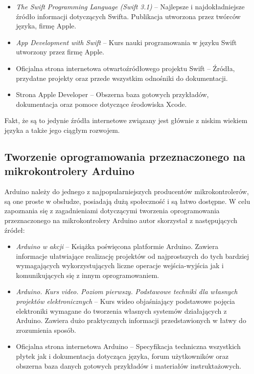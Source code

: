 \documentclass[12pt]{report}
\begin{document}
\begin{itemize}
	\item {\it The Swift Programming Language (Swift 3.1)} \cite{swiftpub} -- Najlepsze i najdokładniejsze źródło informacji dotyczących Swifta. Publikacja utworzona przez twórców języka, firmę Apple. 
	\item {\it App Development with Swift} \cite{swiftdev} -- Kurs nauki programowania w języku Swift utworzony przez firmę Apple.
	\item Oficjalna strona internetowa otwartoźródłowego projektu Swift \cite{swiftstr} -- Źródła, przydatne projekty oraz przede wszystkim odnośniki do dokumentacji.
	\item Strona Apple Developer \cite{swiftapple} -- Obszerna baza gotowych przykładów, dokumentacja oraz pomoce dotyczące środowiska Xcode.
\end{itemize}

Fakt, że są to jedynie źródła internetowe związany jest głównie z niskim wiekiem języka a także jego ciągłym rozwojem.

\subsection{Tworzenie oprogramowania przeznaczonego na mikrokontrolery Arduino}

Arduino należy do jednego z najpopularniejszych producentów mikrokontrolerów, są one proste w obsłudze, posiadają dużą społeczność i są łatwo dostępne. W celu zapoznania się z zagadnieniami dotyczącymi tworzenia oprogramowania przeznaczonego na mikrokontrolery Arduino autor skorzystał z następujących źródeł:

\begin{itemize}
	\item {\it Arduino w akcji} \cite{arduinowakcji} -- Książka poświęcona platformie Arduino. Zawiera informacje ułatwiające realizację projektów od najprostszych do tych bardziej wymagających wykorzystujących liczne operacje wejścia-wyjścia jak i komunikujących się z innym oprogramowaniem.
	\item {\it Arduino. Kurs video. Poziom pierwszy. Podstawowe techniki dla własnych projektów elektronicznych} \cite{arduinovid} -- Kurs wideo objaśniający podstawowe pojęcia elektroniki wymagane do tworzenia własnych systemów działających z Arduino. Zawiera dużo praktycznych informacji przedstawionych w łatwy do zrozumienia sposób.
		\item Oficjalna strona internetowa Arduino \cite{arduinostr} -- Specyfikacja techniczna wszystkich płytek jak i dokumentacja dotycząca języka, forum użytkowników oraz obszerna baza danych gotowych przykładów i materiałów instruktażowych.
\end{itemize}
\end{document}
